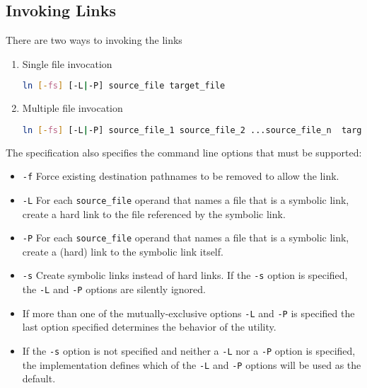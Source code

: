 \subsection{Invoking Links} 
There are two ways to invoking the links
\begin{enumerate}
\item Single file invocation
\begin{lstlisting}[language=bash,numbers=none] 
ln [-fs] [-L|-P] source_file target_file
\end{lstlisting}
\item Multiple file invocation
\begin{lstlisting}[language=bash,numbers=none] 
ln [-fs] [-L|-P] source_file_1 source_file_2 ...source_file_n  target_dir
\end{lstlisting}
\end{enumerate}
The specification also specifies the command line options that must be supported:
\begin{itemize}
\item \verb+-f+ Force existing destination pathnames to be removed to allow the link.
\item \verb+-L+ For each \verb+source_file+ operand that names a file that is a symbolic link,
create a hard link to the file referenced by the symbolic link.
\item \verb+-P+ For each \verb+source_file+ operand that names a file that is a symbolic link, create a (hard)
link to the symbolic link itself.
\item \verb+-s+ Create symbolic links instead of hard links. If the \verb+-s+ option is specified, the \verb+-L+ and \verb+-P+
options are silently ignored.
\item If more than one of the mutually-exclusive options \verb+-L+ and \verb+-P+ is specified the last option specified determines the
behavior of the utility.
\item If the \verb+-s+ option is not specified and neither a \verb+-L+ nor a \verb+-P+ option is specified, the implementation defines
which of the \verb+-L+ and \verb+-P+ options will be used as the default.
\end{itemize}

